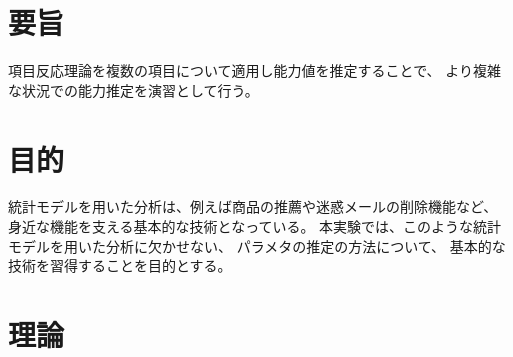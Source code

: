 \documentclass[12pt]{jarticle}
\begin{document}



\section{要旨}
項目反応理論を複数の項目について適用し能力値を推定することで、
より複雑な状況での能力推定を演習として行う。

\section{目的}
統計モデルを用いた分析は、例えば商品の推薦や迷惑メールの削除機能など、
身近な機能を支える基本的な技術となっている。
本実験では、このような統計モデルを用いた分析に欠かせない、
パラメタの推定の方法について、
基本的な技術を習得することを目的とする。

\section{理論}
\end{document}
